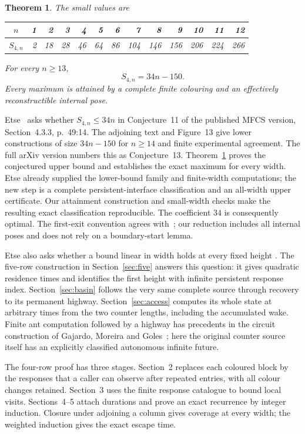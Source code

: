 \documentclass[11pt]{article}
\newtheorem{theorem}{Theorem}
\theoremstyle{definition}\newtheorem{definition}[theorem]{Definition}
\begin{document}
\begin{theorem}\label{thm:main}
The small values are
\begin{center}\small
\begin{tabular}{c|rrrrrrrrrrrr}
$n$&1&2&3&4&5&6&7&8&9&10&11&12\\\hline
$S_{4,n}$&2&18&28&46&64&86&104&146&156&206&224&266
\end{tabular}\end{center}
For every $n\ge13$,
\begin{equation}\label{eq:main} S_{4,n}=34n-150.\end{equation}
Every maximum is attained by a complete finite colouring and an effectively
reconstructible internal pose.
\end{theorem}

Etse~\cite{etse} asks whether $S_{4,n}\le34n$ in Conjecture~11 of the published
MFCS version, Section~4.3.3, p.~49:14. The adjoining text and Figure~13 give
lower constructions of size $34n-150$ for $n\ge14$ and finite experimental
agreement. The full arXiv version numbers this as Conjecture~13.
Theorem~\ref{thm:main} proves the conjectured upper bound and establishes the
exact maximum for every width. Etse already supplied the lower-bound family
and finite-width computations; the new step is a complete persistent-interface
classification and an all-width upper certificate. Our attainment construction
and small-width checks make the resulting exact classification reproducible.
The coefficient $34$ is consequently optimal. The first-exit convention agrees
with~\cite{etse}; our reduction includes all internal poses and does not rely
on a boundary-start lemma.

Etse also asks whether a bound linear in width holds at every fixed height
\cite[Section~5, p.~49:16]{etse}. The five-row construction in
Section~\ref{sec:five} answers this question: it gives quadratic residence times
and identifies the first height with infinite persistent response index.
Section~\ref{sec:basin} follows the very same complete source through recovery
to its permanent highway. Section~\ref{sec:access} computes its whole state at
arbitrary times from the two counter lengths, including the accumulated wake.
Finite ant computation followed by a highway has precedents in the circuit
construction of Gajardo, Moreira and Goles~\cite{gmg}; here the original
counter source itself has an explicitly classified autonomous infinite future.

The four-row proof has three stages. Section~2 replaces each coloured block by the
responses that a caller can observe after repeated entries, with all colour
changes retained. Section~3 uses the finite response catalogue to bound local
visits. Sections~4--5 attach durations and prove an exact recurrence by integer
induction. Closure under adjoining a column gives coverage at every width;
the weighted induction gives the exact escape time.
\end{document}
